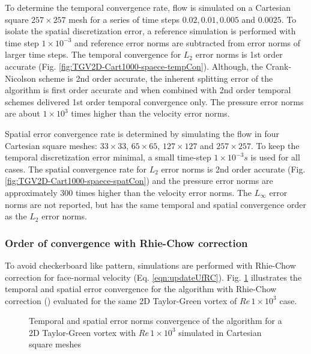 To determine the temporal convergence rate, flow is simulated on a Cartesian square $257 \times 257$ mesh for a series of time steps $0.02, 0.01, 0.005 $ and $0.0025$. To isolate the spatial discretization error, a reference simulation is performed with time step $1\times10^{-3}$ and reference error norms are subtracted from error norms of larger time steps. The temporal convergence for $L_2$ error norms is 1st order accurate (Fig. \ref{fig:TGV2D-Cart1000-spaece-tempCon}). Although, the Crank-Nicolson scheme is 2nd order accurate, the inherent splitting error of the \spaece algorithm is first order accurate and when combined with 2nd order temporal schemes delivered 1st order temporal convergence only. The pressure error norms are about $1\times10^3$ times higher than the velocity error norms.

Spatial error convergence rate is determined by simulating the flow in four Cartesian square meshes: $33 \times 33$, $65 \times 65$, $127 \times 127$ and $257 \times 257$. To keep the temporal discretization error minimal, a small time-step $1\times10^{-3}s$ is used for all cases. The spatial convergence rate for $L_2$ error norms is 2nd order accurate (Fig. \ref{fig:TGV2D-Cart1000-spaece-spatCon}) and the pressure error norms are approximately $300$ times higher than the velocity error norms. The $L_\infty$ error norms are not reported, but has the same temporal and spatial convergence order as the $L_2$ error norms. 


\subsubsection{Order of convergence with Rhie-Chow correction}
\label{sec:OoC-RC}
To avoid checkerboard like pattern, simulations are performed with Rhie-Chow correction\cite{rhie1983} for face-normal velocity (Eq. \eqref{eqn:updateUfRC}). Fig. \ref{fig:TGV2D-Cart1000-spaeceRC} illustrates the temporal and spatial error convergence for the \spaece algorithm with Rhie-Chow correction (\spaeceRC) evaluated for the same 2D Taylor-Green vortex of $Re\,1\times10^3$ case.
\begin{figure}[!h]
\centering
{}
\caption{Temporal and spatial error norms convergence of the \spaeceRC algorithm for a 2D Taylor-Green vortex with $Re\,1\times10^3$ simulated in Cartesian square meshes} 
\label{fig:TGV2D-Cart1000-spaeceRC}
\end{figure}

